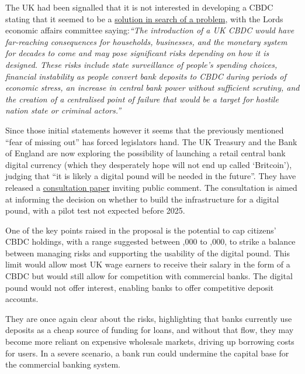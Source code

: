 \begin{itemize}
The UK had been signalled that it is not interested in developing a CBDC stating that it seemed to be a \href{https://committees.parliament.uk/publications/8443/documents/85604/default/}{solution in search of a problem}, with the Lords economic affairs committee saying:\textit{``The introduction of a UK CBDC would have far-reaching consequences for households, businesses, and the monetary system for decades to come and may pose significant risks depending on how it is designed. These risks include state surveillance of people’s spending choices, financial instability as people convert bank deposits to CBDC during periods of economic stress, an increase in central bank power without sufficient scrutiny, and the creation of a centralised point of failure that would be a target for hostile nation state or criminal actors.''}\par
Since those initial statements however it seems that the previously mentioned ``fear of missing out'' has forced legislators hand. The UK Treasury and the Bank of England are now exploring the possibility of launching a retail central bank digital currency (which they desperately hope will not end up called `Britcoin'), judging that ``it is likely a digital pound will be needed in the future''. They have released a \href{https://www.gov.uk/government/news/hm-treasury-and-bank-of-england-consider-plans-for-a-digital-pound}{consultation paper} inviting public comment. The consultation is aimed at informing the decision on whether to build the infrastructure for a digital pound, with a pilot test not expected before 2025.\par
One of the key points raised in the proposal is the potential to cap citizens' CBDC holdings, with a range suggested between ,000 to ,000, to strike a balance between managing risks and supporting the usability of the digital pound. This limit would allow most UK wage earners to receive their salary in the form of a CBDC but would still allow for competition with commercial banks. The digital pound would not offer interest, enabling banks to offer competitive deposit accounts.\par
They are once again clear about the risks, highlighting that banks currently use deposits as a cheap source of funding for loans, and without that flow, they may become more reliant on expensive wholesale markets, driving up borrowing costs for users. In a severe scenario, a bank run could undermine the capital base for the commercial banking system. \par

\end{itemize}
